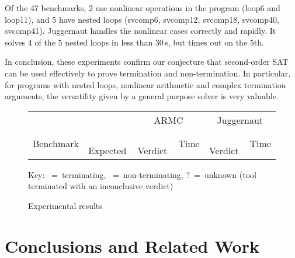 \documentclass[a4paper]{llncs}
\newcommand{\xmark}{\ding{55}}
\newcommand{\tick}{\checkmark}
\begin{document}
Of the 47 benchmarks, 2 use nonlinear operations in the program (loop6 and loop11),
and 5 have nested loops (svcomp6, svcomp12, svcomp18, svcomp40, svcomp41).
{\sc Juggernaut} handles the nonlinear cases correctly and rapidly.
It solves 4 of the 5 nested loops in less than 30\,s, but times out on the 5th.


In conclusion,
these experiments confirm our conjecture that second-order SAT can be used
effectively to prove termination and non-termination.  In particular,
for programs with nested loops, nonlinear arithmetic and complex
termination arguments, the versatility given by a general purpose solver %
is very valuable.

\begin{figure}
\centering
\small
\begin{tabular}{|l|@{}c@{}||@{}c@{}|r||@{}c@{}|r|}
\hline
          &             & \multicolumn{2}{|c||}{\sc ARMC} & \multicolumn{2}{|c|}{\sc Juggernaut} \\
Benchmark & \,Expected\, & \,Verdict\, & Time & \,Verdict\, & Time \\
    \hline
    \hline

    \hline
\end{tabular}

Key: \tick~=~terminating, \xmark~=~non-terminating, ?~=~unknown (tool terminated with an inconclusive verdict)

\caption{Experimental results\label{fig:experiments}}
 \end{figure}

\section{Conclusions and Related Work}
\end{document}
